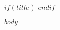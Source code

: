 \documentclass[\myfontsize]{extarticle}
\begin{document}
$if(title)$
$endif$

$body$
\end{document}
